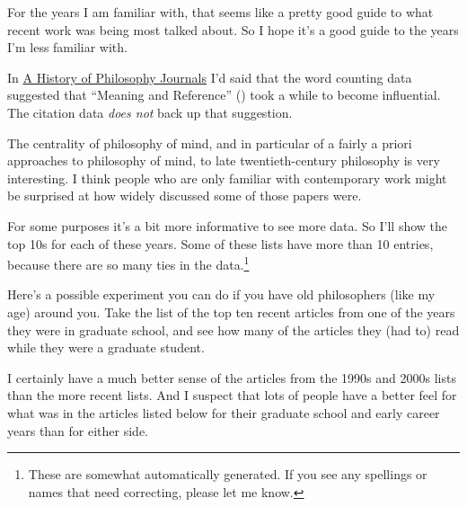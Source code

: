 \documentclass[
  10pt,
  letterpaper,
  DIV=11,
  numbers=noendperiod,
  twoside]{scrartcl}
\begin{document}
\begin{longtable}[]{@{}
  >{\raggedright\arraybackslash}p{}
  >{\raggedright\arraybackslash}p{}@{}}
\end{longtable}

For the years I am familiar with, that seems like a pretty good guide to
what recent work was being most talked about. So I hope it's a good
guide to the years I'm less familiar with.

In \href{https://websites.umich.edu/~weath/lda/topic85.html}{A History
of Philosophy Journals} I'd said that the word counting data suggested
that ``Meaning and Reference'' () took a while to become influential. The citation data \emph{does
not} back up that suggestion.

The centrality of philosophy of mind, and in particular of a fairly a
priori approaches to philosophy of mind, to late twentieth-century
philosophy is very interesting. I think people who are only familiar
with contemporary work might be surprised at how widely discussed some
of those papers were.

For some purposes it's a bit more informative to see more data. So I'll
show the top 10s for each of these years. Some of these lists have more
than 10 entries, because there are so many ties in the data.\footnote{These
  are somewhat automatically generated. If you see any spellings or
  names that need correcting, please let me know.}

Here's a possible experiment you can do if you have old philosophers
(like my age) around you. Take the list of the top ten recent articles
from one of the years they were in graduate school, and see how many of
the articles they (had to) read while they were a graduate student.

I certainly have a much better sense of the articles from the 1990s and
2000s lists than the more recent lists. And I suspect that lots of
people have a better feel for what was in the articles listed below for
their graduate school and early career years than for either side.
\end{document}
